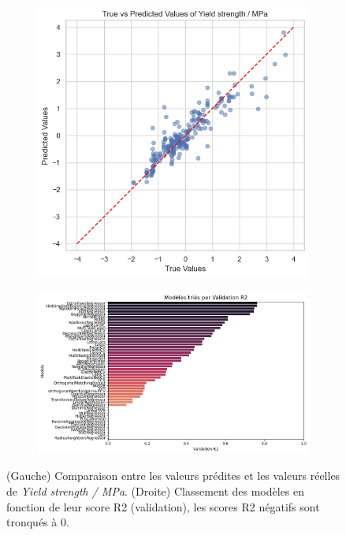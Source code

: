 \documentclass{article}
\begin{document}
\begin{figure}[H]
    \centering
    \begin{subfigure}[b]{0.40\textwidth}
        \centering
        \includegraphics[width=\textwidth]{images/predictions_vs_true.png}
        \label{fig:predictions_vs_true}
    \end{subfigure}
    \hfill
    \begin{subfigure}[b]{0.55\textwidth}
        \centering
        \includegraphics[width=\textwidth, height=0.25\textheight]{images/model_R2_results.png}
        \label{fig:R2_results}
    \end{subfigure}
    \caption{(Gauche) Comparaison entre les valeurs prédites et les valeurs réelles de \textit{Yield strength / MPa}. (Droite) Classement des modèles en fonction de leur score R2 (validation), les scores R2 négatifs sont tronqués à 0.}
    \label{fig:model_results}
\end{figure}
\end{document}
